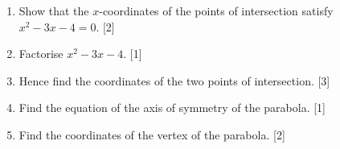 \documentclass[12pt, twoside]{article}
\begin{document}
\begin{enumerate}[itemsep=0.2cm]
\begin{enumerate}[itemsep=0.15cm]
  \item Show that the $x$-coordinates of the points of intersection satisfy\\
        $x^2 - 3x - 4 = 0$. \hfill [2]
  \item Factorise $x^2 - 3x - 4$. \hfill [1]
  \item Hence find the coordinates of the two points of intersection. \hfill [3]
  \item Find the equation of the axis of symmetry of the parabola. \hfill [1]
  \item Find the coordinates of the vertex of the parabola. \hfill [2]
\end{enumerate}


\end{enumerate}
\end{document}
